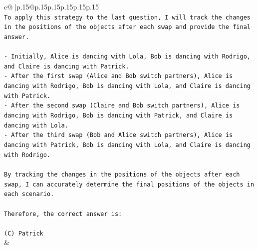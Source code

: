 \documentclass{article}
\begin{document}
{\begin{supertabular}{c@{$\;$}|p{.15\linewidth}@{}p{.15\linewidth}p{.15\linewidth}p{.15\linewidth}p{.15\linewidth}p{.15\linewidth}}
{{{\\ 
\texttt{To apply this strategy to the last question, I will track the changes in the positions of the objects after each swap and provide the final answer.} \\
\\ 
\texttt{{-} Initially, Alice is dancing with Lola, Bob is dancing with Rodrigo, and Claire is dancing with Patrick.} \\
\texttt{{-} After the first swap (Alice and Bob switch partners), Alice is dancing with Rodrigo, Bob is dancing with Lola, and Claire is dancing with Patrick.} \\
\texttt{{-} After the second swap (Claire and Bob switch partners), Alice is dancing with Rodrigo, Bob is dancing with Patrick, and Claire is dancing with Lola.} \\
\texttt{{-} After the third swap (Bob and Alice switch partners), Alice is dancing with Patrick, Bob is dancing with Lola, and Claire is dancing with Rodrigo.} \\
\\ 
\texttt{By tracking the changes in the positions of the objects after each swap, I can accurately determine the final positions of the objects in each scenario.} \\
\\ 
\texttt{Therefore, the correct answer is:} \\
\\ 
\texttt{(C) Patrick} \\
            }
        }
    }
    & \\ \\

\end{supertabular}
}
\end{document}
